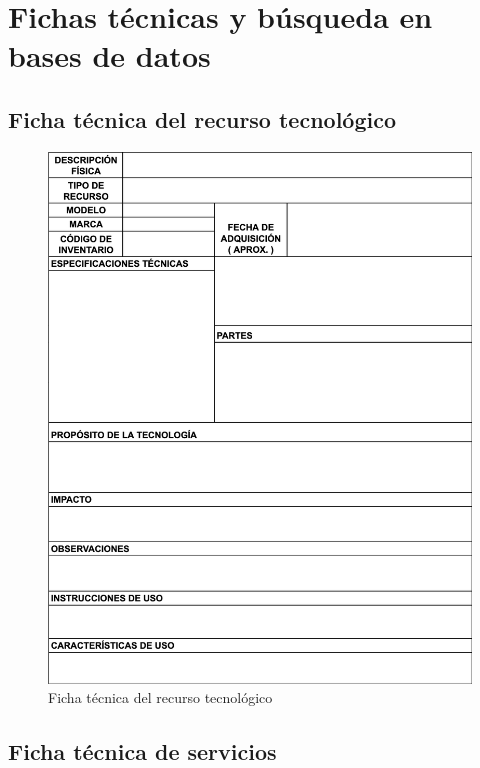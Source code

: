 \appendix

\chapter{Fichas técnicas y búsqueda en bases de datos}\label{apendice:fichas-y-busquedas}

\section*{Ficha técnica del recurso tecnológico}
\begin{figure}[htbp]
    \centering
    \includegraphics[width=\textwidth,height=0.85\textheight,keepaspectratio]{apendices/caracterizacionInfraestructura.png}
    \caption{Ficha técnica del recurso tecnológico}\label{fig:tabla-ficha-tecnica}
\end{figure}
\FloatBarrier\section*{Ficha técnica de servicios}

